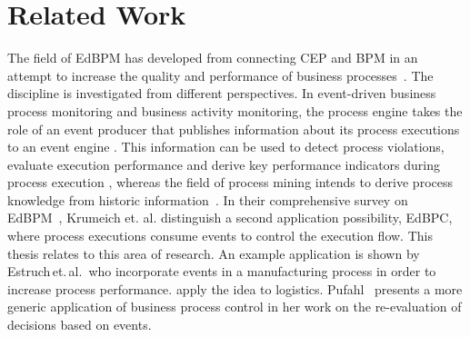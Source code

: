 \chapter{Related Work}\label{ch:relatedwork}


The field of \acf{EdBPM} has developed from connecting \ac{CEP} and \ac{BPM} in an attempt to increase the quality and performance of business processes~\cite{luckham2008power}.
The discipline is investigated from different perspectives.
In event-driven business process monitoring and business activity monitoring, the process engine takes the role of an event producer that publishes information about its process executions to an event engine \cite{baumgrass2014bpmn, herzberg2013improving, bulow2013monitoring}. 
This information can be used to detect process violations, evaluate execution performance and derive key performance indicators during process execution \cite{janiesch2011blueprint, janiesch:poc-eventdriven-bam}, whereas the field of process mining intends to derive process knowledge from historic information~\cite{tiwari2008review}.
In their comprehensive survey on \ac{EdBPM}~\cite{Krumeich2014EventDrivenBP}, Krumeich et. al. distinguish a second application possibility, \acf{EdBPC}, where process executions consume events to control the execution flow. This thesis relates to this area of research.
An example application is shown by Estruch\,et.\,al.\,\cite{estruch2012event} who incorporate events in a manufacturing process in order to increase process performance. \cite{Cabanillas2014, Baumgrass2016} apply the idea to logistics.
Pufahl~\cite{Pufahl2017} presents a more generic application of business process control in her work on the re-evaluation of decisions based on events.


